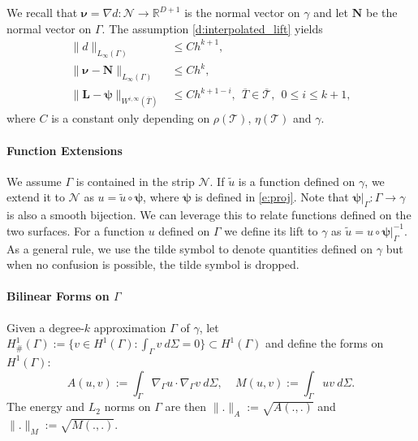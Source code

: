 \documentclass{siamart0516}
\newcommand{\bnu}{\ensuremath{\boldsymbol \nu}}
\newcommand{\bpsi}{\ensuremath{\boldsymbol \psi}}
\newcommand{\bN}{\ensuremath{\boldsymbol N}}
\newcommand{\bL}{\ensuremath{\boldsymbol L}}
\numberwithin{equation}{section}
\numberwithin{theorem}{section}
\numberwithin{figure}{section}
\begin{document}
We recall that $\bnu=\nabla d: \mathcal{N} \rightarrow \mathbb{R}^{D+1}$ is the normal vector on $\gamma$ and let $\bN$ be the normal vector on $\Gamma$.  The assumption \eqref{d:interpolated_lift} yields
\begin{align}\label{e:d_estim}
\|d\|_{L_\infty(\Gamma)} & \le Ch^{k+1},
\\ \|\bnu-\bN\|_{L_\infty(\Gamma)} & \le Ch^k,
\\
\label{e:lift_estim}
\|\bL-\bpsi\|_{W^{i,\infty}(\overline{T})} & \le Ch^{k+1-i}, ~~\overline{T} \in \overline{\mathcal{T}},  ~~0 \le i \le k+1,
\end{align}
where $C$ is a constant only depending on $\rho(\mathcal T)$, $\eta(\mathcal T)$ and $\gamma$.

\paragraph{Function Extensions} We assume $\Gamma$ is contained in the strip $\mathcal N$. 
If $\tilde u$ is a function defined on $\gamma$,  we extend it to $\mathcal{N}$ as $u = \tilde u\circ \bpsi$, where $\bpsi$ is defined in \eqref{e:proj}.  Note that $\bpsi |_\Gamma:\Gamma \rightarrow \gamma$ is also a smooth bijection. We can leverage this to relate functions defined on the two surfaces. For a function $u$ defined on $\Gamma$ we define its lift to $\gamma$ as $\tilde u = u \circ\bpsi|_{\Gamma}^{-1}$. 
As a general rule, we use the tilde symbol to denote quantities defined on $\gamma$ but when no confusion is possible, the tilde symbol is dropped.

\paragraph{Bilinear Forms on $\Gamma$}
Given a degree-$k$ approximation $\Gamma$ of $\gamma$, %
let $H^1_\#(\Gamma):=\{ v \in H^1(\Gamma): \int_{\Gamma} v ~ d\Sigma = 0\} \subset H^1(\Gamma)$
and define the forms on $H^1(\Gamma)$:  
\begin{equation}
A(u,v) :=\int_{\Gamma}\nabla_{\Gamma} u \cdot \nabla_{\Gamma} v ~ d\Sigma,~~~~~M(u,v) :=\int_{\Gamma}uv~ d\Sigma.
\end{equation}
The energy and $L_2$ norms on $\Gamma$ are then $\|.\|_{A} := \sqrt{A(.,.)}$ and $\|.\|_{M} := \sqrt{M(.,.)}$.  
\end{document}
